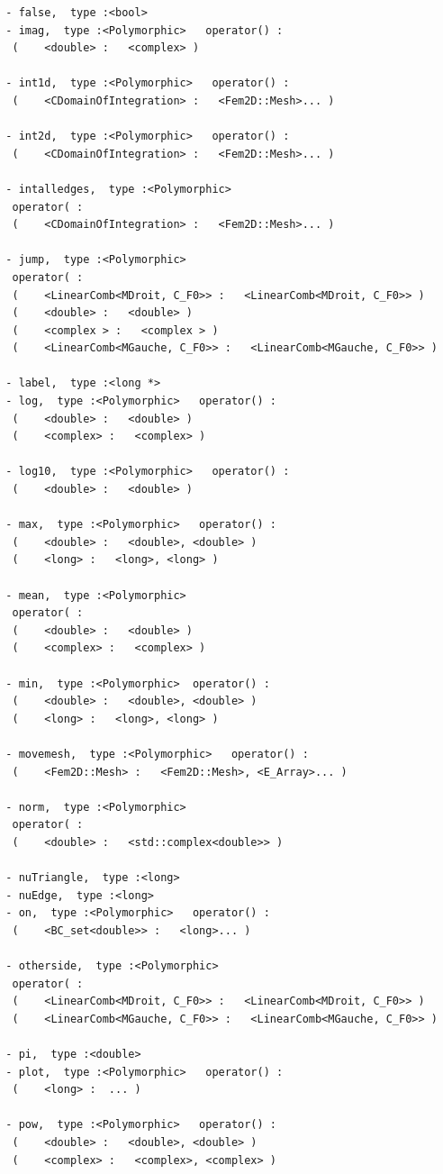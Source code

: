 \documentclass[a4paper,twoside,12pt]{book}
\begin{document}
{\begin{verbatim}
  - false,  type :<bool>
  - imag,  type :<Polymorphic>   operator() :
   (    <double> :   <complex> )

  - int1d,  type :<Polymorphic>   operator() :
   (    <CDomainOfIntegration> :   <Fem2D::Mesh>... )

  - int2d,  type :<Polymorphic>   operator() :
   (    <CDomainOfIntegration> :   <Fem2D::Mesh>... )

  - intalledges,  type :<Polymorphic>
   operator( :
   (    <CDomainOfIntegration> :   <Fem2D::Mesh>... )

  - jump,  type :<Polymorphic>
   operator( :
   (    <LinearComb<MDroit, C_F0>> :   <LinearComb<MDroit, C_F0>> )
   (    <double> :   <double> )
   (    <complex > :   <complex > )
   (    <LinearComb<MGauche, C_F0>> :   <LinearComb<MGauche, C_F0>> )

  - label,  type :<long *>
  - log,  type :<Polymorphic>   operator() :
   (    <double> :   <double> )
   (    <complex> :   <complex> )

  - log10,  type :<Polymorphic>   operator() :
   (    <double> :   <double> )

  - max,  type :<Polymorphic>   operator() :
   (    <double> :   <double>, <double> )
   (    <long> :   <long>, <long> )

  - mean,  type :<Polymorphic>
   operator( :
   (    <double> :   <double> )
   (    <complex> :   <complex> )

  - min,  type :<Polymorphic>  operator() :
   (    <double> :   <double>, <double> )
   (    <long> :   <long>, <long> )

  - movemesh,  type :<Polymorphic>   operator() :
   (    <Fem2D::Mesh> :   <Fem2D::Mesh>, <E_Array>... )

  - norm,  type :<Polymorphic>
   operator( :
   (    <double> :   <std::complex<double>> )

  - nuTriangle,  type :<long>
  - nuEdge,  type :<long>
  - on,  type :<Polymorphic>   operator() :
   (    <BC_set<double>> :   <long>... )

  - otherside,  type :<Polymorphic>
   operator( :
   (    <LinearComb<MDroit, C_F0>> :   <LinearComb<MDroit, C_F0>> )
   (    <LinearComb<MGauche, C_F0>> :   <LinearComb<MGauche, C_F0>> )

  - pi,  type :<double>
  - plot,  type :<Polymorphic>   operator() :
   (    <long> :  ... )

  - pow,  type :<Polymorphic>   operator() :
   (    <double> :   <double>, <double> )
   (    <complex> :   <complex>, <complex> )


\end{verbatim}}
\end{document}
